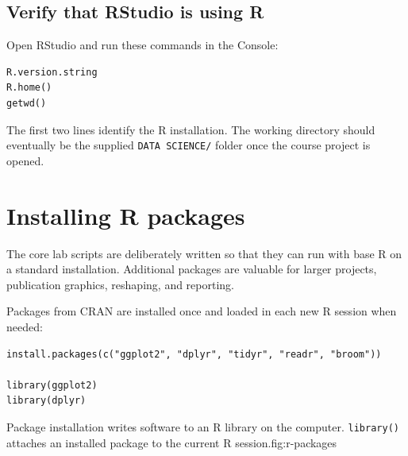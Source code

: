 \subsection{Verify that RStudio is using R}

Open RStudio and run these commands in the Console:

\begin{lstlisting}[style=utpr]
R.version.string
R.home()
getwd()
\end{lstlisting}

The first two lines identify the R installation. The working directory should eventually be the supplied \texttt{DATA SCIENCE/} folder once the course project is opened.

\section{Installing R packages}

The core lab scripts are deliberately written so that they can run with base R on a standard installation. Additional packages are valuable for larger projects, publication graphics, reshaping, and reporting.

Packages from CRAN are installed once and loaded in each new R session when needed:

\begin{lstlisting}[style=utpr]
install.packages(c("ggplot2", "dplyr", "tidyr", "readr", "broom"))

library(ggplot2)
library(dplyr)
\end{lstlisting}

\begin{utpfig}{Package installation writes software to an R library on the computer. \texttt{library()} attaches an installed package to the current R session.}{fig:r-packages}
\end{utpfig}

